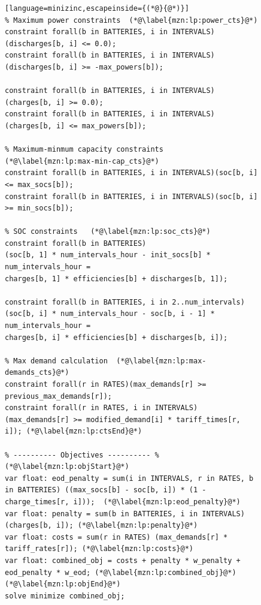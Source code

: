 \begin{figure}[hp!]
\begin{lstlisting}[language=minizinc,escapeinside={(*@}{@*)}]
% Maximum power constraints  (*@\label{mzn:lp:power_cts}@*)
constraint forall(b in BATTERIES, i in INTERVALS)(discharges[b, i] <= 0.0);
constraint forall(b in BATTERIES, i in INTERVALS)(discharges[b, i] >= -max_powers[b]);

constraint forall(b in BATTERIES, i in INTERVALS)(charges[b, i] >= 0.0);
constraint forall(b in BATTERIES, i in INTERVALS)(charges[b, i] <= max_powers[b]);		

% Maximum-minmum capacity constraints  (*@\label{mzn:lp:max-min-cap_cts}@*)
constraint forall(b in BATTERIES, i in INTERVALS)(soc[b, i] <= max_socs[b]);
constraint forall(b in BATTERIES, i in INTERVALS)(soc[b, i] >= min_socs[b]);

% SOC constraints   (*@\label{mzn:lp:soc_cts}@*)
constraint forall(b in BATTERIES) 
(soc[b, 1] * num_intervals_hour - init_socs[b] * num_intervals_hour = 
charges[b, 1] * efficiencies[b] + discharges[b, 1]);

constraint forall(b in BATTERIES, i in 2..num_intervals) 
(soc[b, i] * num_intervals_hour - soc[b, i - 1] * num_intervals_hour = 
charges[b, i] * efficiencies[b] + discharges[b, i]);

% Max demand calculation  (*@\label{mzn:lp:max-demands_cts}@*)
constraint forall(r in RATES)(max_demands[r] >= previous_max_demands[r]);
constraint forall(r in RATES, i in INTERVALS)
(max_demands[r] >= modified_demand[i] * tariff_times[r, i]); (*@\label{mzn:lp:ctsEnd}@*)

% ---------- Objectives ---------- % (*@\label{mzn:lp:objStart}@*)
var float: eod_penalty = sum(i in INTERVALS, r in RATES, b in BATTERIES) ((max_socs[b] - soc[b, i]) * (1 - charge_times[r, i]));  (*@\label{mzn:lp:eod_penalty}@*)
var float: penalty = sum(b in BATTERIES, i in INTERVALS)(charges[b, i]); (*@\label{mzn:lp:penalty}@*)
var float: costs = sum(r in RATES) (max_demands[r] * tariff_rates[r]); (*@\label{mzn:lp:costs}@*)
var float: combined_obj = costs + penalty * w_penalty + eod_penalty * w_eod; (*@\label{mzn:lp:combined_obj}@*) (*@\label{mzn:lp:objEnd}@*)
solve minimize combined_obj;
\end{lstlisting}
\end{figure}

